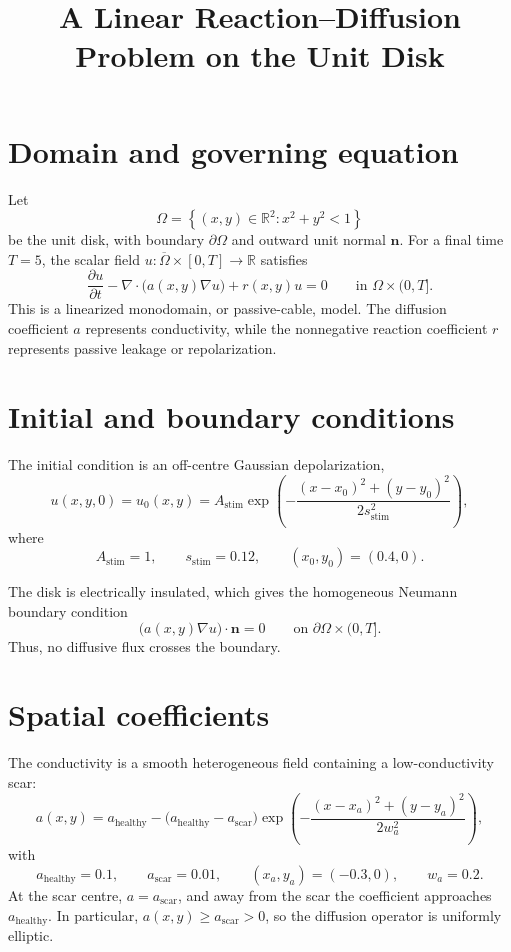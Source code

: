 \documentclass[11pt]{article}
\title{A Linear Reaction--Diffusion Problem on the Unit Disk}
\author{}
\date{}
\newcommand{\R}{\mathbb{R}}
\begin{document}
\maketitle

\section{Domain and governing equation}

Let
\[
    \Omega=\left\{(x,y)\in\R^2:x^2+y^2<1\right\}
\]
be the unit disk, with boundary $\partial\Omega$ and outward unit normal
$\bm n$. For a final time $T=5$, the scalar field
$u:\overline{\Omega}\times[0,T]\to\R$ satisfies
\begin{equation}
    \frac{\partial u}{\partial t}
    -\nabla\cdot\bigl(a(x,y)\nabla u\bigr)
    +r(x,y)u=0
    \qquad\text{in }\Omega\times(0,T].
    \label{eq:pde}
\end{equation}
This is a linearized monodomain, or passive-cable, model. The diffusion
coefficient $a$ represents conductivity, while the nonnegative reaction
coefficient $r$ represents passive leakage or repolarization.

\section{Initial and boundary conditions}

The initial condition is an off-centre Gaussian depolarization,
\begin{equation}
    u(x,y,0)=u_0(x,y)
    =A_{\mathrm{stim}}
    \exp\!\left(
        -\frac{(x-x_0)^2+(y-y_0)^2}{2s_{\mathrm{stim}}^2}
    \right),
    \label{eq:initial}
\end{equation}
where
\[
    A_{\mathrm{stim}}=1,
    \qquad s_{\mathrm{stim}}=0.12,
    \qquad (x_0,y_0)=(0.4,0).
\]

The disk is electrically insulated, which gives the homogeneous Neumann
boundary condition
\begin{equation}
    \bigl(a(x,y)\nabla u\bigr)\cdot\bm n=0
    \qquad\text{on }\partial\Omega\times(0,T].
    \label{eq:boundary}
\end{equation}
Thus, no diffusive flux crosses the boundary.

\section{Spatial coefficients}

The conductivity is a smooth heterogeneous field containing a
low-conductivity scar:
\begin{equation}
    a(x,y)=a_{\mathrm{healthy}}
    -\bigl(a_{\mathrm{healthy}}-a_{\mathrm{scar}}\bigr)
    \exp\!\left(
        -\frac{(x-x_a)^2+(y-y_a)^2}{2w_a^2}
    \right),
    \label{eq:diffusivity}
\end{equation}
with
\[
    a_{\mathrm{healthy}}=0.1,
    \qquad a_{\mathrm{scar}}=0.01,
    \qquad (x_a,y_a)=(-0.3,0),
    \qquad w_a=0.2.
\]
At the scar centre, $a=a_{\mathrm{scar}}$, and away from the scar the
coefficient approaches $a_{\mathrm{healthy}}$. In particular,
$a(x,y)\geq a_{\mathrm{scar}}>0$, so the diffusion operator is uniformly
elliptic.
\end{document}
